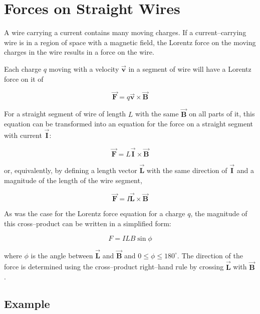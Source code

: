\documentclass{article}
\newcommand{\bfvec}[1]{\vec{\mathbf{#1}}}
\begin{document}
\section{Forces on Straight Wires}

A wire carrying a current contains many moving charges. If a current--carrying wire is in a region of space with a magnetic field, the Lorentz force on the moving charges in the wire results in a force on the wire.

Each charge $q$ moving with a velocity $\bfvec{v}$ in a segment of wire  will have a Lorentz force on it of

\begin{equation}
\bfvec{F} = q\bfvec{v}\times\bfvec{B}
\end{equation}

For a straight segment of wire of length $L$ with the same $\bfvec{B}$ on all parts of it, this equation can be transformed into an equation for the force on a straight segment with current $\bfvec{I}$:

\begin{equation}
\bfvec{F} = L\bfvec{I}\times\bfvec{B}
\end{equation}

or, equivalently, by defining a length vector $\bfvec{L}$ with the same direction of $\bfvec{I}$ and a magnitude of the length of the wire segment,

\begin{equation}
\bfvec{F} = I\bfvec{L}\times\bfvec{B}
\end{equation}

As was the case for the Lorentz force equation for a charge $q$, the magnitude of this cross--product can be written in a simplified form:

\begin{equation}
F=ILB\sin\phi
\end{equation}

where $\phi$ is the angle between $\bfvec{L}$ and $\bfvec{B}$ and $0 \le\phi \le 180^{\circ}$. The direction of the force is determined using the cross--product right--hand rule by crossing $\bfvec{L}$ with $\bfvec{B}$.

\ifsolutions

\else

\fi
\ifsolutions\else

\fi

\newpage

\subsection{Example}
\end{document}
